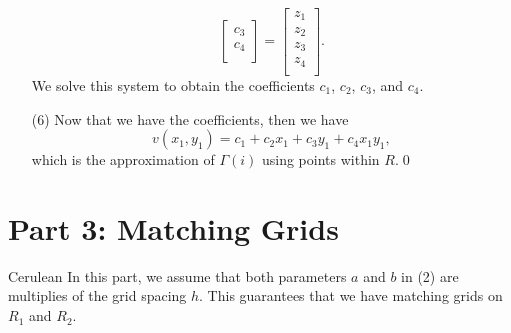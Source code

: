 \documentclass[12pt]{article}
\begin{document}
\begin{itemize}
$$\begin{bmatrix}
				c_3 \\
				c_4 \\
				\end{bmatrix} = \begin{bmatrix}
								z_1 \\
								z_2 \\
								z_3 \\
								z_4 \\
								\end{bmatrix}. $$
We solve this system to obtain the coefficients $c_1$, $c_2$, $c_3$, and $c_4$.
\item[(6)] Now that we have the coefficients, then we have
$$v(x_1,y_1) = c_1 + c_2x_1 + c_3y_1 + c_4x_1y_1,$$
which is the approximation of $\Gamma(i)$ using points within $R$.\qed
\end{itemize}


\newpage
\section{Part 3: Matching Grids} \begin{mybox}{Cerulean}{}
In this part, we assume that both parameters $a$ and $b$ in (2) are multiplies of the grid spacing $h$.  This guarantees that we have matching grids on $R_1$ and $R_2$.\\
\end{mybox}\text{ }\\
\end{document}
